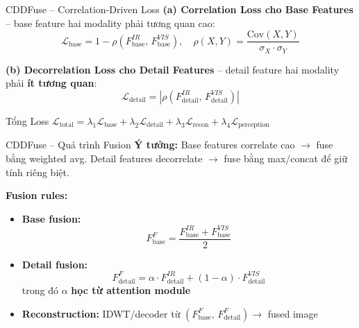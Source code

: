 \documentclass{beamer}
\begin{document}
\begin{frame}{CDDFuse -- Correlation-Driven Loss}
    \small
    \textbf{(a) Correlation Loss cho Base Features} -- base feature hai modality phải tương quan cao:
    \vspace{-0.1cm}
    \begin{equation}
        \mathcal{L}_{\text{base}} = 1 - \rho(F_{\text{base}}^{IR},\, F_{\text{base}}^{VIS}), \quad \rho(X,Y) = \frac{\text{Cov}(X,Y)}{\sigma_X \cdot \sigma_Y}
    \end{equation}

    \vspace{0.1cm}
    \textbf{(b) Decorrelation Loss cho Detail Features} -- detail feature hai modality phải \textbf{ít tương quan}:
    \vspace{-0.1cm}
    \begin{equation}
        \mathcal{L}_{\text{detail}} = |\rho(F_{\text{detail}}^{IR},\, F_{\text{detail}}^{VIS})|
    \end{equation}

    \vspace{0.1cm}
    \begin{block}{Tổng Loss}
        $\mathcal{L}_{\text{total}} = \lambda_1 \mathcal{L}_{\text{base}} + \lambda_2 \mathcal{L}_{\text{detail}} + \lambda_3 \mathcal{L}_{\text{recon}} + \lambda_4 \mathcal{L}_{\text{perception}}$
    \end{block}
\end{frame}

\begin{frame}{CDDFuse -- Quá trình Fusion}
    \textbf{Ý tưởng:} Base features correlate cao $\to$ fuse bằng weighted avg. Detail features decorrelate $\to$ fuse bằng max/concat để giữ tính riêng biệt.

    \vspace{0.3cm}
    \textbf{Fusion rules:}
    \begin{itemize}
        \item \textbf{Base fusion:}
        \begin{equation}
            F_{\text{base}}^{F} = \frac{F_{\text{base}}^{IR} + F_{\text{base}}^{VIS}}{2}
        \end{equation}
        \item \textbf{Detail fusion:}
        \begin{equation}
            F_{\text{detail}}^{F} = \alpha \cdot F_{\text{detail}}^{IR} + (1-\alpha) \cdot F_{\text{detail}}^{VIS}
        \end{equation}
        trong đó $\alpha$ \textbf{học từ attention module}
        \item \textbf{Reconstruction:} IDWT/decoder từ $(F_{\text{base}}^{F},\, F_{\text{detail}}^{F}) \to$ fused image
    \end{itemize}
\end{frame}
\end{document}
